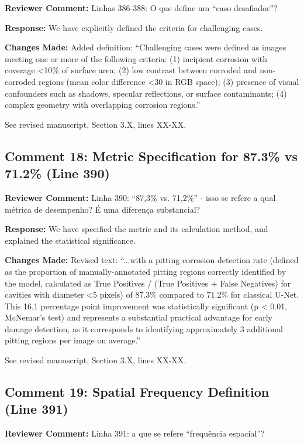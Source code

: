 \documentclass[11pt]{article}
\newcommand{\reviewercomment}[1]{\textcolor{reviewercolor}{\textbf{Reviewer Comment:} #1}}
\newcommand{\response}[1]{\textcolor{responsecolor}{\textbf{Response:} #1}}
\newcommand{\change}[1]{\textcolor{changecolor}{\textbf{Changes Made:} #1}}
\begin{document}
\reviewercomment{Linhas 386-388: O que define um ``caso desafiador''?}

\response{We have explicitly defined the criteria for challenging cases.}

\change{Added definition: ``Challenging cases were defined as images meeting one or more of the following criteria: (1) incipient corrosion with coverage <10\% of surface area; (2) low contrast between corroded and non-corroded regions (mean color difference <30 in RGB space); (3) presence of visual confounders such as shadows, specular reflections, or surface contaminants; (4) complex geometry with overlapping corrosion regions.''

See revised manuscript, Section 3.X, lines XX-XX.}

\subsection{Comment 18: Metric Specification for 87.3\% vs 71.2\% (Line 390)}

\reviewercomment{Linha 390: ``87,3\% vs. 71,2\%'' - isso se refere a qual métrica de desempenho? É uma diferença substancial?}

\response{We have specified the metric and its calculation method, and explained the statistical significance.}

\change{Revised text: ``...with a pitting corrosion detection rate (defined as the proportion of manually-annotated pitting regions correctly identified by the model, calculated as True Positives / (True Positives + False Negatives) for cavities with diameter <5 pixels) of 87.3\% compared to 71.2\% for classical U-Net. This 16.1 percentage point improvement was statistically significant (p < 0.01, McNemar's test) and represents a substantial practical advantage for early damage detection, as it corresponds to identifying approximately 3 additional pitting regions per image on average.''

See revised manuscript, Section 3.X, lines XX-XX.}

\subsection{Comment 19: Spatial Frequency Definition (Line 391)}

\reviewercomment{Linha 391: a que se refere ``frequência espacial''?}
\end{document}
